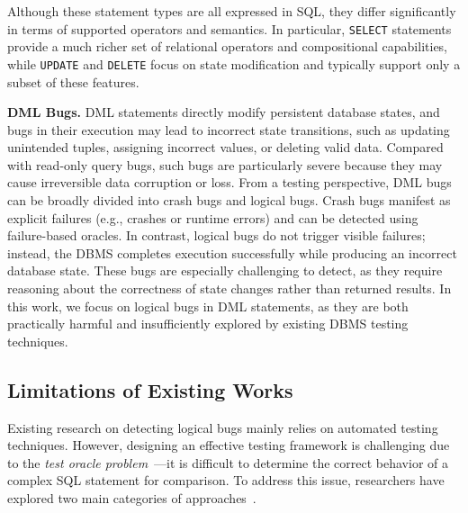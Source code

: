 Although these statement types are all expressed in SQL, they differ significantly in terms of supported operators and semantics. 
In particular, \texttt{SELECT} statements provide a much richer set of relational operators and compositional capabilities, while \texttt{UPDATE} and \texttt{DELETE} focus on state modification and typically support only a subset of these features. 

\textbf{DML Bugs.}
DML statements directly modify persistent database states, and bugs in their execution may lead to incorrect state transitions, such as updating unintended tuples, assigning incorrect values, or deleting valid data. 
Compared with read-only query bugs, such bugs are particularly severe because they may cause irreversible data corruption or loss.
%
From a testing perspective, DML bugs can be broadly divided into crash bugs and logical bugs. 
Crash bugs manifest as explicit failures (e.g., crashes or runtime errors) and can be detected using failure-based oracles. 
In contrast, logical bugs do not trigger visible failures; instead, the DBMS completes execution successfully while producing an incorrect database state. 
These bugs are especially challenging to detect, as they require reasoning about the correctness of state changes rather than returned results.
In this work, we focus on logical bugs in DML statements, as they are both practically harmful and insufficiently explored by existing DBMS testing techniques.

\vspace{-3mm}
\subsection{Limitations of Existing Works}
Existing research on detecting logical bugs mainly relies on automated testing techniques. 
However, designing an effective testing framework is challenging due to the \textit{test oracle problem}~\cite{howden2006theoretical}—it is difficult to determine the correct behavior of a complex SQL statement for comparison. 
To address this issue, researchers have explored two main categories of approaches~\cite{lin2025qtran,song2023testing,tang2023detecting,jiang2024detecting,song2024detecting}. 

